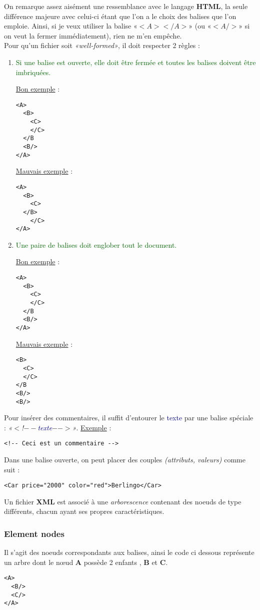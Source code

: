 \documentclass{article}
\newcommand{\gre}[1]{\textcolor{darkgreen}{#1}}
\newcommand{\blu}[1]{\textcolor{darkblue}{#1}}
\begin{document}
On remarque assez aisément une ressemblance avec le langage \textbf{HTML}, la seule différence majeure avec celui-ci étant que l'on a le choix des balises que l'on emploie. 
Ainsi, si je veux utiliser la balise «$<A> </A>$» (ou «$<A/>$»  si on veut la fermer immédiatement), rien ne m'en empêche. \\
Pour qu'un fichier soit \textit{«well-formed»}, il doit 
respecter 2 règles : \\
\begin{enumerate}
\item \gre{Si une balise est ouverte, elle doit être fermée et toutes les balises doivent être imbriquées.}
\begin{multicols}{2}
\underline{Bon exemple} :
\begin{verbatim}
<A>
  <B>
    <C>
    </C>
  </B
  <B/>
</A>
\end{verbatim}
\underline{Mauvais exemple} :
\begin{verbatim}
<A>
  <B>
    <C>
  </B>
    </C>
</A>
\end{verbatim}
\end{multicols}
\item \gre{Une paire de balises doit englober tout le document.}
\begin{multicols}{2}
\underline{Bon exemple} :
\begin{verbatim}
<A>
  <B>
    <C>
    </C>
  </B
  <B/>
</A>
\end{verbatim}
\underline{Mauvais exemple} :
\begin{verbatim}
<B>
  <C>
  </C>
</B
<B/>
<B/>
\end{verbatim}
\end{multicols}
\end{enumerate}

\noindent Pour insérer des commentaires, il suffit d'entourer le \blu{texte} par une balise spéciale : \textit{«$<$!$--$\blu{texte}$-->$»}. \underline{Exemple} : 
\begin{verbatim}
<!-- Ceci est un commentaire -->
\end{verbatim}
Dans une balise ouverte, on peut placer des couples \textit{(attributs, valeurs)} comme suit :
\begin{verbatim}
<Car price="2000" color="red">Berlingo</Car>
\end{verbatim}

\noindent Un fichier \textbf{XML} est  associé à une \textit{arborescence} contenant des noeuds de type différents, chacun ayant ses propres caractéristiques.
\subsubsection{Element nodes}
Il s'agit des noeuds correspondants aux balises, ainsi le code ci dessous représente un arbre dont le n\oe ud \textbf{A} possède 2 enfants , \textbf{B} et \textbf{C}.
\begin{verbatim}
<A>
  <B/>
  <C/>
</A>
\end{verbatim}
\end{document}
